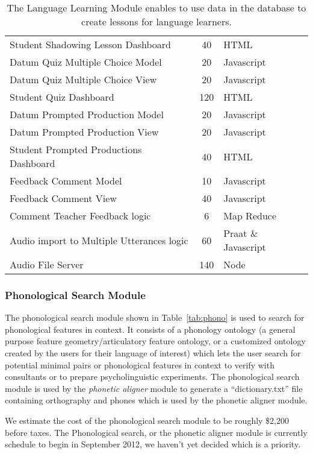 \documentclass[12 pt]{article}
\begin{document}
\begin{table}[htbp]
\begin{center}
\begin{tabular}{ | lcl | }
Student Shadowing Lesson Dashboard &  40 & HTML \\ 
Datum Quiz Multiple Choice Model  & 20  & Javascript \\ 
Datum Quiz Multiple Choice View  &  20  & Javascript \\ 
Student Quiz Dashboard  & 120  & HTML \\ 
Datum Prompted Production Model  & 20  & Javascript \\ 
Datum Prompted Production View  & 20  & Javascript \\ 
Student Prompted Productions Dashboard  &  40  & HTML \\ 
Feedback Comment Model  & 10  & Javascript \\ 
Feedback Comment View  & 40  & Javascript \\ 
Comment Teacher Feedback logic & 6  & Map Reduce \\ 
Audio import to Multiple Utterances logic   & 60  & Praat \& Javascript \\ 
Audio File Server  & 140  & Node \\ 
\hline
  \end{tabular}
 \caption{The Language Learning Module enables to use data in the database to create lessons for language learners.  }
  \label{tab:langlearn}
  \end{center}
\end{table}



\subsubsection{Phonological Search Module}
The phonological search module shown in Table~\ref{tab:phono} is used to search for phonological features in context. It consists of a phonology ontology (a general purpose feature geometry/articulatory feature ontology, or a customized ontology created by the users for their language of interest) which lets the user search for potential minimal pairs or phonological features in context to verify with consultants or to prepare psycholinguistic experiments. The phonological search module is used by the {\it  phonetic aligner} module to generate a ``dictionary.txt'' file containing orthography and phones which is used by the phonetic aligner module.

We estimate the cost of the phonological search module to be roughly \$2,200 before taxes. The Phonological search, or the phonetic aligner module is currently schedule to begin in September 2012, we haven't yet decided which is a priority.
\end{document}
